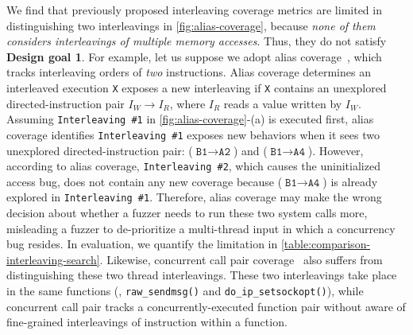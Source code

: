 %
We find that previously proposed interleaving coverage metrics are
limited in distinguishing two interleavings in
\autoref{fig:alias-coverage}, because \textit{none of them considers
  interleavings of multiple memory accesses}.  Thus, they do not
satisfy \textbf{Design goal 1}.
%
For example, let us suppose we adopt alias coverage~\cite{krace},
which tracks interleaving orders of \textit{two} instructions.
%
Alias coverage determines an interleaved execution \texttt{X} exposes
a new interleaving if \texttt{X} contains an unexplored
directed-instruction pair $I_W \rightarrow I_R$, where $I_R$ reads a
value written by $I_W$.
%
Assuming \texttt{Interleaving \#1} in \autoref{fig:alias-coverage}-(a)
is executed first, alias coverage identifies \texttt{Interleaving \#1}
exposes new behaviors when it sees two unexplored directed-instruction
pair: ($\texttt{B1} \rightarrow \texttt{A2}$) and
($\texttt{B1} \rightarrow \texttt{A4}$).
%
However, according to alias coverage, \texttt{Interleaving \#2}, which
causes the uninitialized access bug, does not contain any new coverage
because ($\texttt{B1} \rightarrow \texttt{A4}$) is already explored in
\texttt{Interleaving \#1}.
%
%
Therefore, alias coverage may make the wrong decision about whether a
fuzzer needs to run these two system calls more, misleading a fuzzer
to de-prioritize a multi-thread input in which a concurrency bug
resides. In evaluation, we quantify the limitation in
\autoref{table:comparison-interleaving-search}.
%
Likewise, concurrent call pair coverage~\cite{conzzer} also suffers
from distinguishing these two thread interleavings. These two
interleavings take place in the same functions (\ie,
\texttt{raw_sendmsg()} and \texttt{do_ip_setsockopt()}), while
concurrent call pair tracks a concurrently-executed function pair
without aware of fine-grained interleavings of instruction within a
function.

